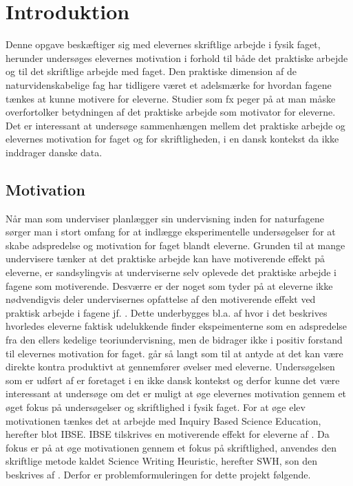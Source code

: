 \chapter{Introduktion}
\label{Ch:1}

Denne opgave beskæftiger sig med elevernes skriftlige arbejde i fysik faget, herunder undersøges elevernes motivation i forhold til både det praktiske arbejde og til det skriftlige arbejde med faget. Den praktiske dimension af de naturvidenskabelige fag har tidligere været et adelsmærke for hvordan fagene tænkes at kunne motivere for eleverne. Studier som fx \citep{Hodson2008} peger på at man måske overfortolker betydningen af det praktiske arbejde som motivator for eleverne. Det er interessant at undersøge sammenhængen mellem det praktiske arbejde og elevernes motivation for faget og for skriftligheden, i en dansk kontekst da \citep{Hodson2008} ikke inddrager danske data.

\section{Motivation}
\label{sec:1.1}
Når man som underviser planlægger sin undervisning inden for naturfagene sørger man i stort omfang for at indlægge eksperimentelle undersøgelser for at skabe adspredelse og motivation for faget blandt eleverne. Grunden til at mange undervisere tænker at det praktiske arbejde kan have motiverende effekt på eleverne, er sandsylingvis at underviserne selv oplevede det praktiske arbejde i fagene som motiverende. Desværre er der noget som tyder på at eleverne ikke nødvendigvis deler undervisernes opfattelse af den motiverende effekt ved praktisk arbejde i fagene jf. \citep[s. 65 - 69]{Krogh2016}. 
Dette underbygges bl.a. af \citep{Hodson2008} hvor i det beskrives hvorledes eleverne faktisk udelukkende finder ekspeimenterne som en adspredelse fra den ellers kedelige teoriundervisning, men de bidrager ikke i positiv forstand til elevernes motivation for faget.  \citet[]{Hodson2008} går så langt som til at antyde at det kan være direkte kontra produktivt at gennemfører øvelser med eleverne. 
Undersøgelsen som er udført af \citet{Hodson2008} er foretaget i en ikke dansk kontekst og derfor kunne det være interessant at undersøge om det er muligt at øge elevernes motivation gennem et øget fokus på undersøgelser og skriftlighed i fysik faget. For at øge elev motivationen tænkes det at arbejde med Inquiry Based Science Education, herefter blot IBSE\def\ib{IBSE}. \ib{} tilskrives en motiverende effekt for eleverne af \citep{Krogh2016, Dolin2014}. Da fokus er på at øge motivationen gennem et fokus på skriftlighed, anvendes den skriftlige metode kaldet Science Writing Heuristic, herefter SWH\def\sw{SWH}, son den beskrives af \citep{Keys1999, Krogh2016}. Derfor er problemformuleringen for dette projekt følgende.

